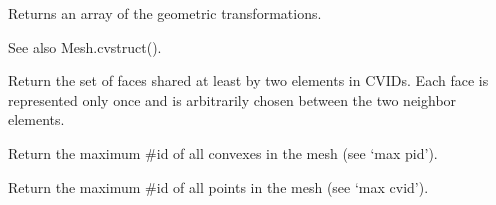 \documentclass[a4paper,11pt,english]{sphinxmanual}
\begin{document}
\begin{fulllineitems}
\begin{fulllineitems}
\end{fulllineitems}


\begin{fulllineitems}
\label{\detokenize{python/cmdref_Mesh:getfem.Mesh.geotrans}}
Returns an array of the geometric transformations.

See also Mesh.cvstruct().

\end{fulllineitems}


\begin{fulllineitems}
\label{\detokenize{python/cmdref_Mesh:getfem.Mesh.inner_faces}}
Return the set of faces shared at least by two elements in CVIDs.
Each face is represented only once and is arbitrarily chosen
between the two neighbor elements.

\end{fulllineitems}


\begin{fulllineitems}
\label{\detokenize{python/cmdref_Mesh:getfem.Mesh.max_cvid}}
Return the maximum \#id of all convexes in the mesh (see ‘max pid’).

\end{fulllineitems}


\begin{fulllineitems}
\label{\detokenize{python/cmdref_Mesh:getfem.Mesh.max_pid}}
Return the maximum \#id of all points in the mesh (see ‘max cvid’).

\end{fulllineitems}



\end{fulllineitems}
\end{document}
